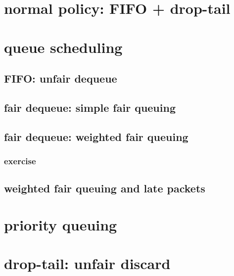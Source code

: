 \section{normal policy: FIFO + drop-tail}


\section{queue scheduling}


\subsection{FIFO: unfair dequeue} 


\subsection{fair dequeue: simple fair queuing}





\subsection{fair dequeue: weighted fair queuing}



\subsubsection{exercise}


\subsection{weighted fair queuing and late packets}



\section{priority queuing}


\section{drop-tail: unfair discard}


